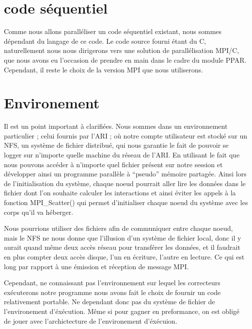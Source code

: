 \section{code séquentiel}

\par Comme nous allons paralléliser un code séquentiel existant,
nous sommes dépendant du langage de ce code. Le code source fourni 
étant du C, naturellement nous nous dirigerons vers une solution 
de parallélisation MPI/C, que nous avons eu l'occasion de prendre 
en main dans le cadre du module PPAR. Cependant, il reste le choix de la 
version MPI que nous utiliserons.\\

\section{Environement}

\par Il est un point important à clarifiées. Nous sommes dans un environnement particulier ; 
celui fournis par l'ARI ; où notre compte utilisateur est stocké sur un NFS, un système de fichier 
distribué, qui nous garantie le fait de pouvoir se logger sur n'importe quelle machine du réseau 
de l'ARI. En utilisant le fait que nous pouvons accéder à n'importe quel fichier présent sur 
notre session et développer ainsi un programme parallèle à ``pseudo'' mémoire partagée.
Ainsi lors de l'initialisation du système, chaque noeud  pourrait aller lire les données dans le fichier
 dont l'on souhaite calculer les interactions et ainsi éviter les appels à la fonction 
MPI\_Scatter() qui permet d'initialiser chaque noeud du système avec les corps qu'il va héberger.\\

\par Nous pourrions utiliser des fichiers afin de communiquer entre chaque noeud, mais le NFS ne nous
donne que l'illusion d'un système de fichier local, donc il y aurait quand même deux accès réseau pour 
transférer les données, et il faudrait en plus compter deux accès disque, l'un en écriture, l'autre en lecture.
Ce qui est long par rapport à une émission et réception de message MPI.\\

\par Cependant, ne connaissant pas l'environnement sur lequel les correcteurs exécuterons notre 
programme nous avons fait le choix de fournir un code relativement portable. Ne dependant donc pas du système
de fichier de l'environement d'éxécution.
Même si pour gagner en preformance, on est obligé de jouer avec l'archictecture de l'environement d'éxécuion.\\


